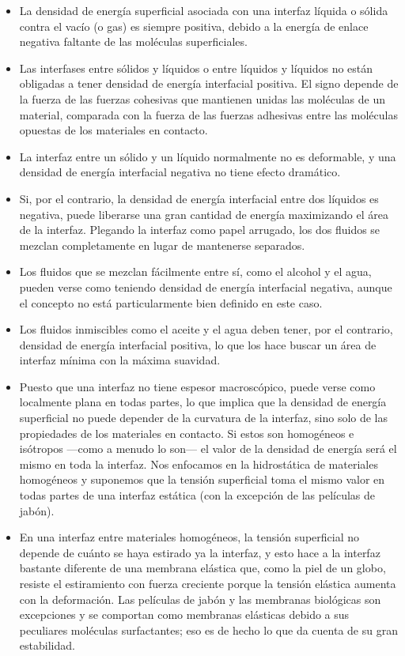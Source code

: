 \figuraFuerzaCurvaOrientada

\begin{itemize}
\item La densidad de energía superficial asociada con una interfaz líquida o sólida contra el vacío (o gas) es siempre positiva, debido a la energía de enlace negativa faltante de las moléculas superficiales.
\item Las interfases entre sólidos y líquidos o entre líquidos y líquidos no están obligadas a tener densidad de energía interfacial positiva. El signo depende de la fuerza de las fuerzas cohesivas que mantienen unidas las moléculas de un material, comparada con la fuerza de las fuerzas adhesivas entre las moléculas opuestas de los materiales en contacto.
\item La interfaz entre un sólido y un líquido normalmente no es deformable, y una densidad de energía interfacial negativa no tiene efecto dramático.
\item Si, por el contrario, la densidad de energía interfacial entre dos líquidos es negativa, puede liberarse una gran cantidad de energía maximizando el área de la interfaz. Plegando la interfaz como papel arrugado, los dos fluidos se mezclan completamente en lugar de mantenerse separados.
\item Los fluidos que se mezclan fácilmente entre sí, como el alcohol y el agua, pueden verse como teniendo densidad de energía interfacial negativa, aunque el concepto no está particularmente bien definido en este caso.
\item Los fluidos inmiscibles como el aceite y el agua deben tener, por el contrario, densidad de energía interfacial positiva, lo que los hace buscar un área de interfaz mínima con la máxima suavidad.
\item Puesto que una interfaz no tiene espesor macroscópico, puede verse como localmente plana en todas partes, lo que implica que la densidad de energía superficial no puede depender de la curvatura de la interfaz, sino solo de las propiedades de los materiales en contacto. Si estos son homogéneos e isótropos ---como a menudo lo son--- el valor de la densidad de energía será el mismo en toda la interfaz. Nos enfocamos en la hidrostática de materiales homogéneos y suponemos que la tensión superficial toma el mismo valor en todas partes de una interfaz estática (con la excepción de las películas de jabón).
\item En una interfaz entre materiales homogéneos, la tensión superficial no depende de cuánto se haya estirado ya la interfaz, y esto hace a la interfaz bastante diferente de una membrana elástica que, como la piel de un globo, resiste el estiramiento con fuerza creciente porque la tensión elástica aumenta con la deformación. Las películas de jabón y las membranas biológicas son excepciones y se comportan como membranas elásticas debido a sus peculiares moléculas surfactantes; eso es de hecho lo que da cuenta de su gran estabilidad.
\end{itemize}


